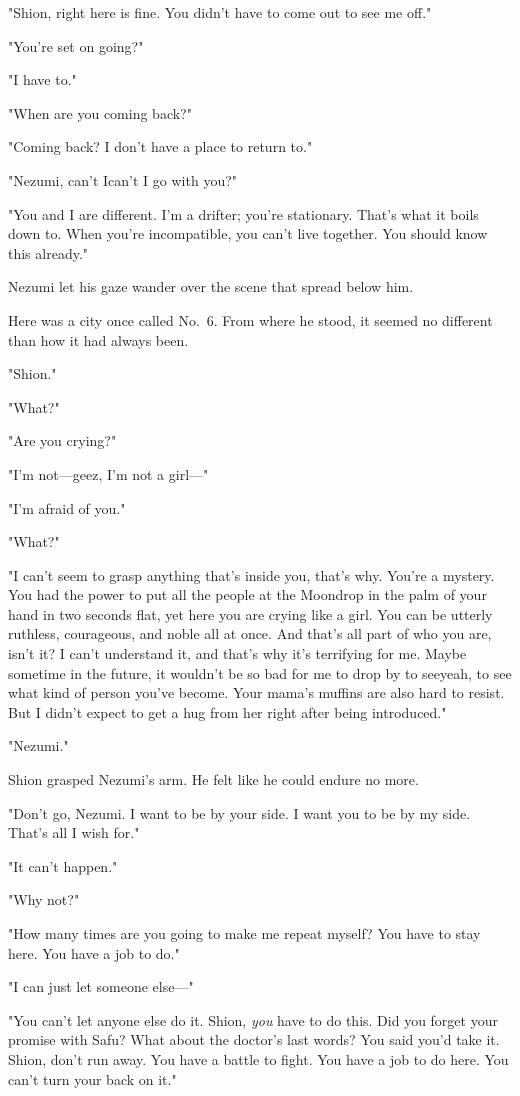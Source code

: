 "Shion, right here is fine. You didn't have to come out to see me off."

"\el You're set on going?"

"I have to."

"When are you coming back?"

"Coming back? I don't have a place to return to."

"Nezumi, can't I\el can't I go with you?"

"You and I are different. I'm a drifter; you're stationary. That's what
it boils down to. When you're incompatible, you can't live together. You
should know this already."

Nezumi let his gaze wander over the scene that spread below him.

Here was a city once called No.~6. From where he stood, it seemed no
different than how it had always been.

"Shion."

"What?"

"Are you crying?"

"I'm not---geez, I'm not a girl---"

"I'm afraid of you."

"What?"

"I can't seem to grasp anything that's inside you, that's why. You're a
mystery. You had the power to put all the people at the Moondrop in the
palm of your hand in two seconds flat, yet here you are crying like a
girl. You can be utterly ruthless, courageous, and noble all at once.
And that's all part of who you are, isn't it? I can't understand it, and
that's why it's terrifying for me. Maybe sometime in the future, it
wouldn't be so bad for me to drop by to see\el yeah, to see what kind of
person you've become. Your mama's muffins are also hard to resist. But I
didn't expect to get a hug from her right after being introduced."

"Nezumi."

Shion grasped Nezumi's arm. He felt like he could endure no more.

"Don't go, Nezumi. I want to be by your side. I want you to be by my
side. That's all I wish for."

"It can't happen."

"Why not?"

"How many times are you going to make me repeat myself? You have to stay
here. You have a job to do."

"I can just let someone else---"

"You can't let anyone else do it. Shion, \emph{you} have to do this. Did you
forget your promise with Safu? What about the doctor's last words? You
said you'd take it. Shion, don't run away. You have a battle to fight.
You have a job to do here. You can't turn your back on it."

